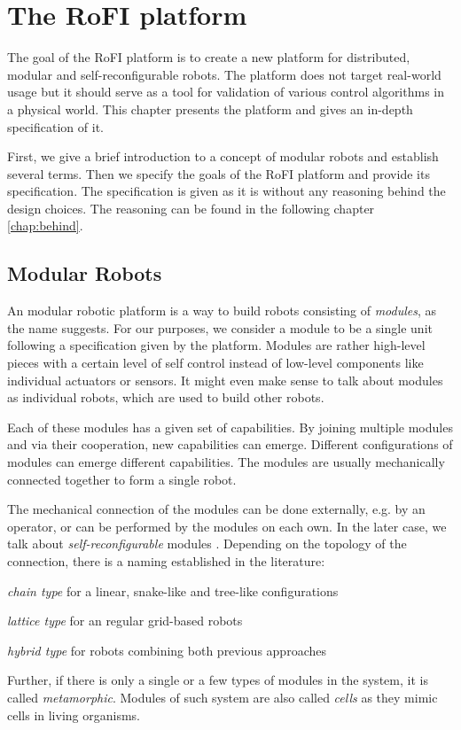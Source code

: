 \chapter{The RoFI platform}\label{chap:rofi}

The goal of the RoFI platform is to create a new platform for distributed,
modular and self-reconfigurable robots. The platform does not target real-world
usage but it should serve as a tool for validation of various control algorithms
in a physical world. This chapter presents the platform and gives an in-depth
specification of it.

First, we give a brief introduction to a concept of modular robots and establish
several terms. Then we specify the goals of the RoFI platform and provide its
specification. The specification is given as it is without any reasoning behind
the design choices. The reasoning can be found in the following chapter
\ref{chap:behind}.

\section{Modular Robots}

An modular robotic platform is a way to build robots consisting of
\emph{modules}, as the name suggests. For our purposes, we consider a module to
be a single unit following a specification given by the platform. Modules are
rather high-level pieces with a certain level of self control instead of
low-level components like individual actuators or sensors. It might even make
sense to talk about modules as individual robots, which are used to build other
robots\cite{brunete_current_2017}.

Each of these modules has a given set of capabilities. By joining multiple
modules and via their cooperation, new capabilities can emerge. Different
configurations of modules can emerge different capabilities. The modules are
usually mechanically connected together to form a single robot.

The mechanical connection of the modules can be done externally, e.g. by an
operator, or can be performed by the modules on each own. In the later case, we
talk about \emph{self-reconfigurable} modules \cite{brunete_current_2017}.
Depending on the topology of the connection, there is a naming established in
the literature\cite{brunete_current_2017}:
\begin{enumerate*}
    \item \emph{chain type} for a linear, snake-like and tree-like configurations
    \item \emph{lattice type} for an regular grid-based robots
    \item \emph{hybrid type} for robots combining both previous approaches
\end{enumerate*}
Further, if there is only a single or a few types of modules in the system, it
is called \emph{metamorphic}\cite{brunete_current_2017}. Modules of such system
are also called \emph{cells} as they mimic cells in living organisms.

